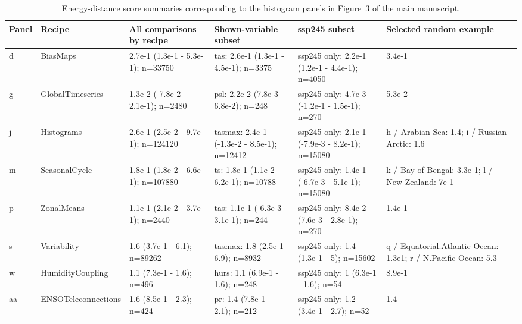 \begin{table}[t]
\centering
\caption{Energy-distance score summaries corresponding to the histogram panels in Figure~3 of the main manuscript.}
\label{tab:validation-main-edist}
\small
\setlength{\tabcolsep}{4pt}
\begin{tabularx}{\textwidth}{@{}l l X X X X@{}}
\toprule
Panel & Recipe & All comparisons by recipe & Shown-variable subset & ssp245 subset & Selected random example \\
\midrule
d & BiasMaps & 2.7e-1 (1.3e-1 - 5.3e-1); n=33750 & tas: 2.6e-1 (1.3e-1 - 4.5e-1); n=3375 & ssp245 only: 2.2e-1 (1.2e-1 - 4.4e-1); n=4050 & 3.4e-1 \\
g & GlobalTimeseries & 1.3e-2 (-7.8e-2 - 2.1e-1); n=2480 & psl: 2.2e-2 (7.8e-3 - 6.8e-2); n=248 & ssp245 only: 4.7e-3 (-1.2e-1 - 1.5e-1); n=270 & 5.3e-2 \\
j & Histograms & 2.6e-1 (2.5e-2 - 9.7e-1); n=124120 & tasmax: 2.4e-1 (-1.3e-2 - 8.5e-1); n=12412 & ssp245 only: 2.1e-1 (-7.9e-3 - 8.2e-1); n=15080 & h / Arabian-Sea: 1.4; i / Russian-Arctic: 1.6 \\
m & SeasonalCycle & 1.8e-1 (1.8e-2 - 6.6e-1); n=107880 & ts: 1.8e-1 (1.1e-2 - 6.2e-1); n=10788 & ssp245 only: 1.4e-1 (-6.7e-3 - 5.1e-1); n=15080 & k / Bay-of-Bengal: 3.3e-1; l / New-Zealand: 7e-1 \\
p & ZonalMeans & 1.1e-1 (2.1e-2 - 3.7e-1); n=2440 & tas: 1.1e-1 (-6.3e-3 - 3.1e-1); n=244 & ssp245 only: 8.4e-2 (7.6e-3 - 2.8e-1); n=270 & 1.4e-1 \\
s & Variability & 1.6 (3.7e-1 - 6.1); n=89262 & tasmax: 1.8 (2.5e-1 - 6.9); n=8932 & ssp245 only: 1.4 (1.3e-1 - 5); n=15602 & q / Equatorial.Atlantic-Ocean: 1.3e1; r / N.Pacific-Ocean: 5.3 \\
w & HumidityCoupling & 1.1 (7.3e-1 - 1.6); n=496 & hurs: 1.1 (6.9e-1 - 1.6); n=248 & ssp245 only: 1 (6.3e-1 - 1.6); n=54 & 8.9e-1 \\
aa & ENSOTeleconnections & 1.6 (8.5e-1 - 2.3); n=424 & pr: 1.4 (7.8e-1 - 2.1); n=212 & ssp245 only: 1.2 (3.4e-1 - 2.7); n=52 & 1.4 \\
\bottomrule
\end{tabularx}
\end{table}
